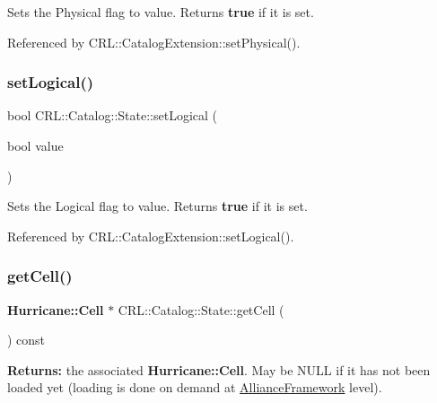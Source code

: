 Sets the Physical flag to {\ttfamily value}. Returns {\bfseries true} if it is set. 

Referenced by C\+R\+L\+::\+Catalog\+Extension\+::set\+Physical().

\mbox{\label{classCRL_1_1Catalog_1_1State_af41327abeb4e7646ef5cafabe8eeabd0}} 
\subsubsection{\texorpdfstring{set\+Logical()}{setLogical()}}
{\footnotesize\ttfamily bool C\+R\+L\+::\+Catalog\+::\+State\+::set\+Logical (\begin{DoxyParamCaption}\item[{bool}]{value }\end{DoxyParamCaption})\hspace{0.3cm}{\ttfamily [inline]}}

Sets the Logical flag to {\ttfamily value}. Returns {\bfseries true} if it is set. 

Referenced by C\+R\+L\+::\+Catalog\+Extension\+::set\+Logical().

\mbox{\label{classCRL_1_1Catalog_1_1State_a0cc5ef54176f8207ef4e723eed62c35e}} 
\subsubsection{\texorpdfstring{get\+Cell()}{getCell()}}
{\footnotesize\ttfamily \textbf{ Hurricane\+::\+Cell} $\ast$ C\+R\+L\+::\+Catalog\+::\+State\+::get\+Cell (\begin{DoxyParamCaption}{ }\end{DoxyParamCaption}) const\hspace{0.3cm}{\ttfamily [inline]}}

{\bfseries Returns\+:} the associated \textbf{ Hurricane\+::\+Cell}. May be N\+U\+LL if it has not been loaded yet (loading is done on demand at \mbox{\hyperlink{classCRL_1_1AllianceFramework}{Alliance\+Framework}} level). \mbox{\label{classCRL_1_1Catalog_1_1State_a89dad78f1829b1ee3177f61e2f73d6c6}} 

